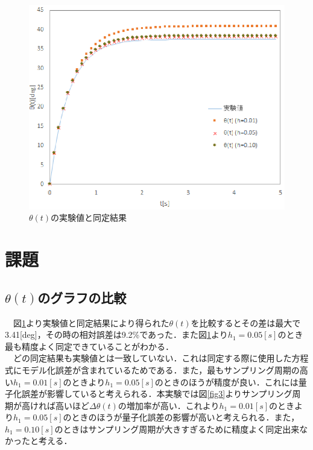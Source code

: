 \documentclass[11pt,a4paper]{jsarticle}
\begin{document}
\begin{figure}[htb]
 \begin{center}
  \includegraphics[scale = 1]{./picture/graph4.eps}
 \end{center}
 \caption{$\theta(t)$の実験値と同定結果}
 \label{fig6}
\end{figure}

\newpage

 \section{課題}
  \subsection{$\theta(t)$のグラフの比較}
  　図\ref{fig6}より実験値と同定結果により得られた$\theta(t)$を比較するとその差は最大で3.41[deg]，その時の相対誤差は9.2\%であった．また図\ref{fig6}より$h_1 = 0.05[s]$のとき最も精度よく同定できていることがわかる． \\
  　どの同定結果も実験値とは一致していない．これは同定する際に使用した方程式にモデル化誤差が含まれているためである．また，最もサンプリング周期の高い$h_1 = 0.01[s]$のときより$h_1 = 0.05[s]$のときのほうが精度が良い．これには量子化誤差が影響していると考えられる．本実験では図\ref{fig3}よりサンプリング周期が高ければ高いほど$\Delta \theta(t)$の増加率が高い．これより$h_1 = 0.01[s]$のときより$h_1 = 0.05[s]$のときのほうが量子化誤差の影響が高いと考えられる．また，$h_1 = 0.10[s]$のときはサンプリング周期が大きすぎるために精度よく同定出来なかったと考える．
\end{document}

